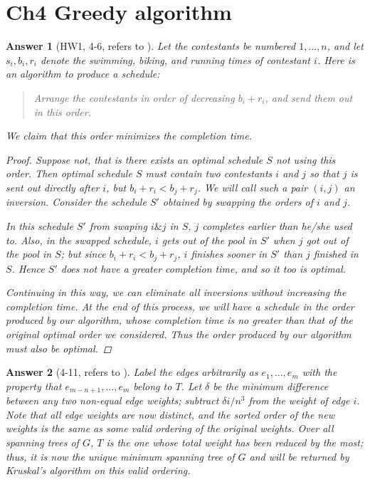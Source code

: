 \documentclass[11pt]{article}
\theoremstyle{numberplain}
\theoremstyle{nonumberplain}
\newtheorem{proof}{Proof}
\newtheorem{ans}{Answer}
\newcommand{\0}{{\mathbf{0}}}
\begin{document}
\section{Ch4 Greedy algorithm}
\begin{ans}[HW1, 4-6, refers to \cite{solcornell}]
Let the contestants be numbered $1, \ldots, n$,
and let $s_i, b_i, r_i$ denote the swimming, biking, and
running times of contestant $i$.
Here is an algorithm to produce a schedule:
\begin{quote}
Arrange the contestants in order of decreasing $b_i + r_i$,
and send them out in this order.
\end{quote}
We claim that this order minimizes the completion time.

\begin{proof}
Suppose not, that is there exists an optimal schedule $S$ not using this order.
Then optimal schedule $S$ must contain two contestants $i$ and $j$ so that $j$ is sent out
directly after $i$, but $b_i + r_i < b_j + r_j$. We will call such a pair $(i,j)$ an {\em inversion}.
Consider the schedule $S'$ obtained by swapping the orders of $i$ and $j$.\par 
In this schedule $S'$ from swaping $i\& j$ in $S$, $j$ completes earlier than he/she used to.
Also, in the swapped schedule, $i$ gets out of the pool in $S'$ when $j$ got out of the pool in $S$;
but since $b_i + r_i < b_j + r_j$, $i$ finishes
sooner in $S'$ than $j$ finished
in $S$.
Hence $S'$ does not have a greater
completion time, and so it too is optimal.
\par 
Continuing in this way, we can eliminate all
inversions without increasing the completion time.
At the end of this process, we will have a 
schedule in the order produced by our algorithm,
whose completion time is no greater than that of
the original optimal order we considered.
Thus the order produced by our algorithm must
also be optimal.
\end{proof}
\end{ans}

\begin{ans}[4-11, refers to \cite{solcornell}]
Label the edges arbitrarily as $e_1, \ldots, e_m$
with the property that $e_{m-n+1}, \ldots, e_m$
belong to $T$.
Let $\delta$ be the minimum difference between
any two non-equal edge weights;
subtract $\delta i / n^3$ from the weight of edge $i$.
Note that all edge weights are now distinct,
and the sorted order of the new weights is the
same as some valid ordering of the original weights.
Over all spanning trees of $G$, $T$ is the one whose
total weight has been reduced by the most;
thus, it is now the unique minimum spanning tree
of $G$ and will be returned by Kruskal's algorithm
on this valid ordering.
\end{ans}
\end{document}
